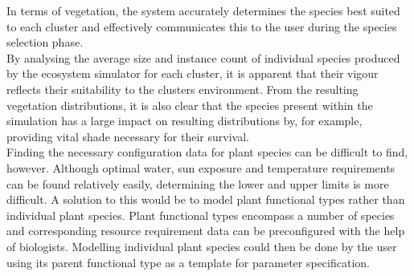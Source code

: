 In terms of vegetation, the system accurately determines the species best suited to each cluster and effectively communicates this to the user during the species selection phase.\\
By analysing the average size and instance count of individual species produced by the ecosystem simulator for each cluster, it is apparent that their vigour reflects their suitability to the clusters environment. From the resulting vegetation distributions, it is also clear that the species present within the simulation has a large impact on resulting distributions by, for example, providing vital shade necessary for their survival.\\
Finding the necessary configuration data for plant species can be difficult to find, however. Although optimal water, sun exposure and temperature requirements can be found relatively easily, determining the lower and upper limits is more difficult. A solution to this would be to model plant functional types rather than individual plant species. Plant functional types encompass a number of species and corresponding resource requirement data can be preconfigured with the help of biologists. Modelling individual plant species could then be done by the user using its parent functional type as a template for parameter specification.\\
